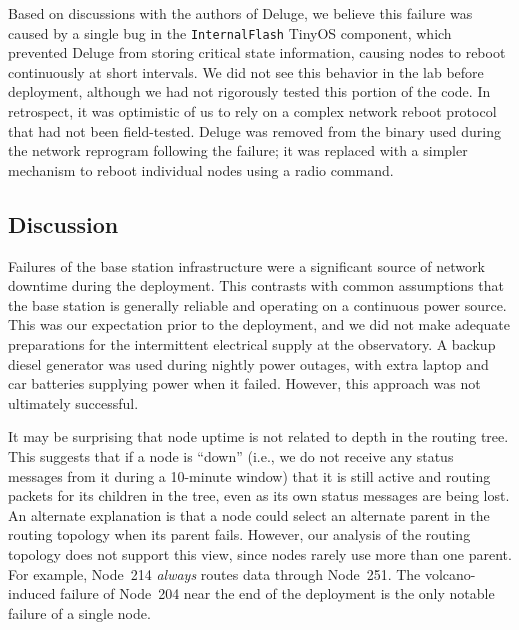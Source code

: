 Based on discussions with the authors of Deluge, we believe this failure was
caused by a single bug in the \texttt{InternalFlash} TinyOS component, which
prevented Deluge from storing critical state information, causing nodes to
reboot continuously at short intervals. We did not see this behavior in the
lab before deployment, although we had not rigorously tested this portion of
the code. In retrospect, it was optimistic of us to rely on a complex network
reboot protocol that had not been field-tested. Deluge was removed from the
binary used during the network reprogram following the failure; it was
replaced with a simpler mechanism to reboot individual nodes using a radio
command.

\subsection{Discussion}

Failures of the base station infrastructure were a significant source of
network downtime during the deployment. This contrasts with common
assumptions that the base station is generally reliable and operating on a
continuous power source. This was our expectation prior to the deployment,
and we did not make adequate preparations for the intermittent electrical
supply at the observatory. A backup diesel generator was used during nightly
power outages, with extra laptop and car batteries supplying power when it
failed. However, this approach was not ultimately successful.

It may be surprising that node uptime is not related to depth in the routing
tree. This suggests that if a node is ``down'' (i.e., we do not receive any
status messages from it during a 10-minute window) that it is still active
and routing packets for its children in the tree, even as its own status
messages are being lost. An alternate explanation is that a node could select
an alternate parent in the routing topology when its parent fails. However,
our analysis of the routing topology does not support this view, since nodes
rarely use more than one parent. For example, Node~214 \textit{always} routes
data through Node~251. The volcano-induced failure of Node~204 near the end
of the deployment is the only notable failure of a single node.
